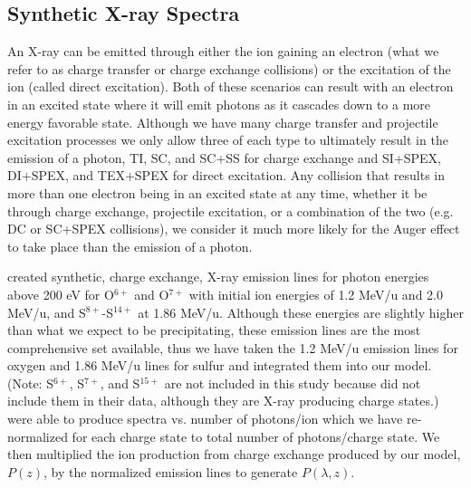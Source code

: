 \documentclass[draft]{agujournal2018}
\begin{document}
\subsection{Synthetic X-ray Spectra}
\label{sec:XraySpec}

An X-ray can be emitted through either the ion gaining an electron (what we refer to as charge transfer or charge exchange collisions) or the excitation of the ion (called direct excitation).
Both of these scenarios can result with an electron in an excited state where it will emit photons as it cascades down to a more energy favorable state.
Although we have many charge transfer and projectile excitation processes we only allow three of each type to ultimately result in the emission of a photon, TI, SC, and SC+SS for charge exchange and SI+SPEX, DI+SPEX, and TEX+SPEX for direct excitation.
Any collision that results in more than one electron being in an excited state at any time, whether it be through charge exchange, projectile excitation, or a combination of the two (e.g. DC or SC+SPEX collisions), we consider it much more likely for the Auger effect to take place than the emission of a photon.

\citet{hui2010} created synthetic, charge exchange, X-ray emission lines for photon energies above 200 eV for O$^{6+}$ and O$^{7+}$ with initial ion energies of 1.2 MeV/u and 2.0 MeV/u, and S$^{8+}$-S$^{14+}$ at 1.86 MeV/u.
Although these energies are slightly higher than what we expect to be precipitating, these emission lines are the most comprehensive set available, thus we have taken the 1.2 MeV/u emission lines for oxygen and 1.86 MeV/u lines for sulfur and integrated them into our model.
(Note: S$^{6+}$, S$^{7+}$, and S$^{15+}$ are not included in this study because \citet{hui2010} did not include them in their data, although they are X-ray producing charge states.)
\citet{hui2010} were able to produce spectra vs. number of photons/ion which we have re-normalized for each charge state to total number of photons/charge state.
We then multiplied the ion production from charge exchange produced by our model, $P(z)$, by the normalized emission lines to generate $P(\lambda,z)$.
\end{document}

